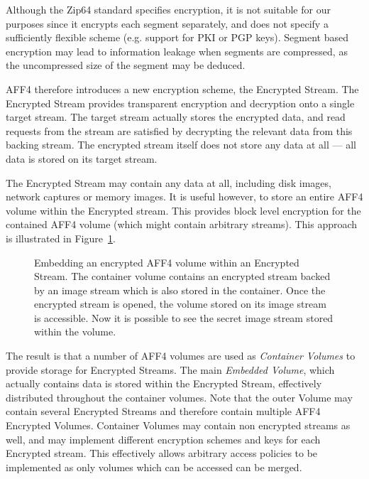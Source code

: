 \documentclass[10pt, conference]{IEEEtran}
\begin{document}
Although the Zip64 standard specifies encryption, it is not suitable
for our purposes since it encrypts each segment separately, and does
not specify a sufficiently flexible scheme (e.g. support for PKI or
PGP keys). Segment based encryption may lead to information leakage
when segments are compressed, as the uncompressed size of the segment
may be deduced.

AFF4 therefore introduces a new encryption scheme, the Encrypted
Stream.  The Encrypted Stream provides transparent encryption and
decryption onto a single target stream. The target stream actually
stores the encrypted data, and read requests from the stream are
satisfied by decrypting the relevant data from this backing
stream. The encrypted stream itself does not store any data at all ---
all data is stored on its target stream.

The Encrypted Stream may contain any data at all, including disk
images, network captures or memory images. It is useful however, to
store an entire AFF4 volume within the Encrypted stream. This provides
block level encryption for the contained AFF4 volume (which might
contain arbitrary streams). This approach is illustrated in
Figure~\ref{crypted_fif}.

\begin{figure}[tb]
  \begin{center}
  \mbox{\columnwidth {}}

  \caption{Embedding an encrypted AFF4 volume within an Encrypted
  Stream. The container volume contains an encrypted stream backed by
  an image stream which is also stored in the container. Once the
  encrypted stream is opened, the volume stored on its image stream is
  accessible. Now it is possible to see the secret image stream stored
  within the volume.}

  \label{crypted_fif}
  \end{center}
\end{figure}

The result is that a number of AFF4 volumes are used as {\em Container
Volumes} to provide storage for Encrypted Streams. The main {\em
Embedded Volume}, which actually contains data is stored within the
Encrypted Stream, effectively distributed throughout the container
volumes. Note that the outer Volume may contain several Encrypted
Streams and therefore contain multiple AFF4 Encrypted
Volumes. Container Volumes may contain non encrypted streams as well,
and may implement different encryption schemes and keys for each
Encrypted stream. This effectively allows arbitrary access policies to
be implemented as only volumes which can be accessed can be merged.
\end{document}
